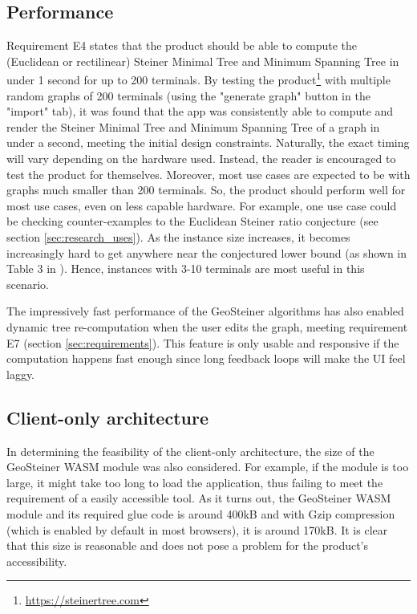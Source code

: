 \documentclass{l4proj}
\begin{document}
\subsection{Performance}
\label{sec:performance}
Requirement E4 states that the product should be able to compute the (Euclidean or rectilinear) Steiner Minimal Tree and Minimum Spanning Tree in under 1 second for up to 200 terminals.
By testing the product\footnote{\url{https://steinertree.com}} with multiple random graphs of 200 terminals (using the "generate graph" button in the "import" tab), it was found that the app was consistently able to compute and render the Steiner Minimal Tree and Minimum Spanning Tree of a graph in under a second, meeting the initial design constraints. Naturally, the exact timing will vary depending on the hardware used.  Instead, the reader is encouraged to test the product for themselves. Moreover, most use cases are expected to be with graphs much smaller than 200 terminals. So, the product should perform well for most use cases, even on less capable hardware.
For example, one use case could be checking counter-examples to the Euclidean Steiner ratio conjecture (see section \ref{sec:research_uses}). As the instance size increases, it becomes increasingly hard to get anywhere near the conjectured lower bound (as shown in Table 3 in \cite{geosteiner96}). Hence, instances with 3-10 terminals are most useful in this scenario.

The impressively fast performance of the GeoSteiner algorithms has also enabled dynamic tree re-computation when the user edits the graph, meeting requirement E7 (section \ref{sec:requirements}). This feature is only usable and responsive if the computation happens fast enough since long feedback loops will make the UI feel laggy.


\subsection{Client-only architecture}
In determining the feasibility of the client-only architecture, the size of the GeoSteiner WASM module was also considered. For example, if the module is too large, it might take too long to load the application, thus failing to meet the requirement of a easily accessible tool.
As it turns out, the GeoSteiner WASM module and its required glue code is around 400kB and with Gzip compression (which is enabled by default in most browsers), it is around 170kB. It is clear that this size is reasonable and does not pose a problem for the product's accessibility.
\end{document}

